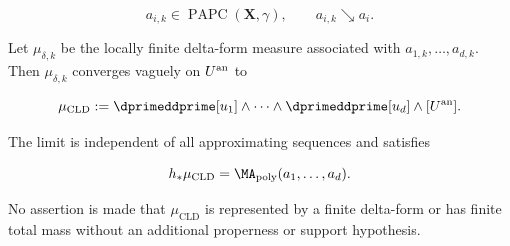 \begin{corollary}
\[
 a_{i,k}\in\operatorname{PAPC}(\mathbf X,\gamma),
 \qquad a_{i,k}\searrow a_i.
\]

Let \(\mu_{\delta,k}\) be the locally finite delta-form measure associated
with \(a_{1,k},\ldots,a_{d,k}\).  Then \(\mu_{\delta,k}\) converges vaguely
on \(U^{\mathrm{an}}\) to

\begin{equation}
 \mu_{\mathrm{CLD}}
 :=\dprimeddprime[u_1]\wedge\cdots\wedge
   \dprimeddprime[u_d]\wedge[U^{\an}].
 \label{eq:p054-repaired-source-limit}
\end{equation}

The limit is independent of all approximating sequences and satisfies

\begin{equation}
 h_*\mu_{\mathrm{CLD}}
 =\MA_{\mathrm{poly}}(a_1,\ldots,a_d).
 \label{eq:p054-repaired-limit-pushforward}
\end{equation}

No assertion is made that \(\mu_{\mathrm{CLD}}\) is represented by a finite
delta-form or has finite total mass without an additional properness or
support hypothesis.
\end{corollary}

